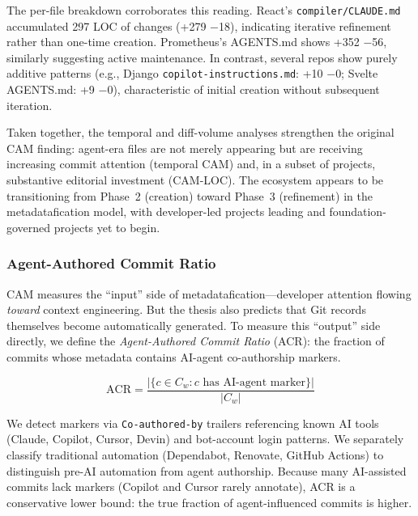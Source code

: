\documentclass[sigconf, nonacm, anonymous=false]{acmart}
\begin{document}
The per-file breakdown corroborates this reading. React's \texttt{compiler/CLAUDE.md} accumulated 297 LOC of changes (+279 $-$18), indicating iterative refinement rather than one-time creation. Prometheus's AGENTS.md shows +352 $-$56, similarly suggesting active maintenance. In contrast, several repos show purely additive patterns (e.g., Django \texttt{copilot-instructions.md}: +10 $-$0; Svelte AGENTS.md: +9 $-$0), characteristic of initial creation without subsequent iteration.

Taken together, the temporal and diff-volume analyses strengthen the original CAM finding: agent-era files are not merely appearing but are receiving increasing commit attention (temporal CAM) and, in a subset of projects, substantive editorial investment (CAM-LOC). The ecosystem appears to be transitioning from Phase~2 (creation) toward Phase~3 (refinement) in the metadatafication model, with developer-led projects leading and foundation-governed projects yet to begin.

\subsubsection{Agent-Authored Commit Ratio}

CAM measures the ``input'' side of metadatafication---developer attention flowing \textit{toward} context engineering. But the thesis also predicts that Git records themselves become automatically generated. To measure this ``output'' side directly, we define the \textit{Agent-Authored Commit Ratio} (ACR): the fraction of commits whose metadata contains AI-agent co-authorship markers.

\begin{equation}
\text{ACR} = \frac{|\{c \in C_w : c \text{ has AI-agent marker}\}|}{|C_w|}
\end{equation}

\noindent We detect markers via \texttt{Co-authored-by} trailers referencing known AI tools (Claude, Copilot, Cursor, Devin) and bot-account login patterns. We separately classify traditional automation (Dependabot, Renovate, GitHub Actions) to distinguish pre-AI automation from agent authorship. Because many AI-assisted commits lack markers (Copilot and Cursor rarely annotate), ACR is a conservative lower bound: the true fraction of agent-influenced commits is higher.
\end{document}
